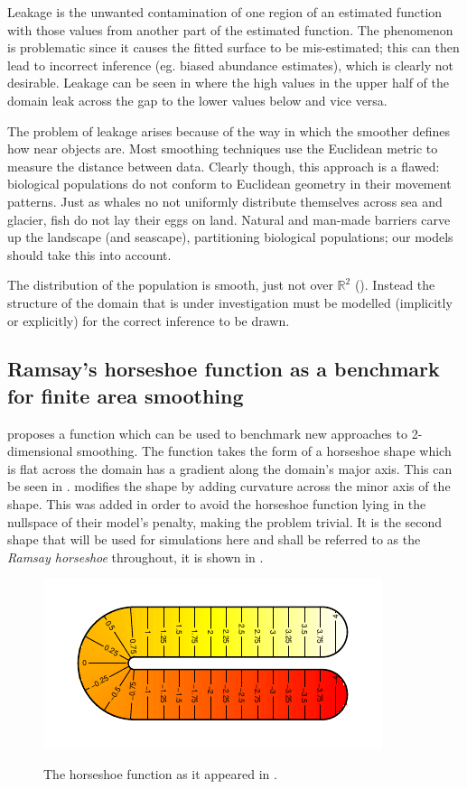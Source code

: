 Leakage is the unwanted contamination of one region of an estimated function with those values from another part of the estimated function. The phenomenon is problematic since it causes the fitted surface to be mis-estimated; this can then lead to incorrect inference (eg. biased abundance estimates), which is clearly not desirable. Leakage can be seen in  where the high values in the upper half of the domain leak across the gap to the lower values below and vice versa.

The problem of leakage arises because of the way in which the smoother defines how near objects are. Most smoothing techniques use the Euclidean metric to measure the distance between data. Clearly though, this approach is a flawed: biological populations do not conform to Euclidean geometry in their movement patterns. Just as whales no not uniformly distribute themselves across sea and glacier, fish do not lay their eggs on land. Natural and man-made barriers carve up the landscape (and seascape), partitioning biological populations; our models should take this into account.

The distribution of the population is smooth, just not over $\mathbb{R}^2$ (\cite{wangranalli}). Instead the structure of the domain that is under investigation must be modelled (implicitly or explicitly) for the correct inference to be drawn.

\subsection{Ramsay's horseshoe function as a benchmark for finite area smoothing}

\cite{ramsay} proposes a function which can be used to benchmark new approaches to 2-dimensional smoothing. The function takes the form of a horseshoe shape which is flat across the domain has a gradient along the domain's major axis. This can be seen in . \cite{soap} modifies the shape by adding curvature across the minor axis of the shape. This was added in order to avoid the horseshoe function lying in the nullspace of their model's penalty, making the problem trivial. It is the second shape that will be used for simulations here and shall be referred to as the \emph{Ramsay horseshoe} throughout, it is shown in .

\begin{figure}
\centering
\includegraphics{intro/figs/orig-fs.pdf}\\
\caption{The horseshoe function as it appeared in \cite{ramsay}.}
\label{orig-fs}
\end{figure}

